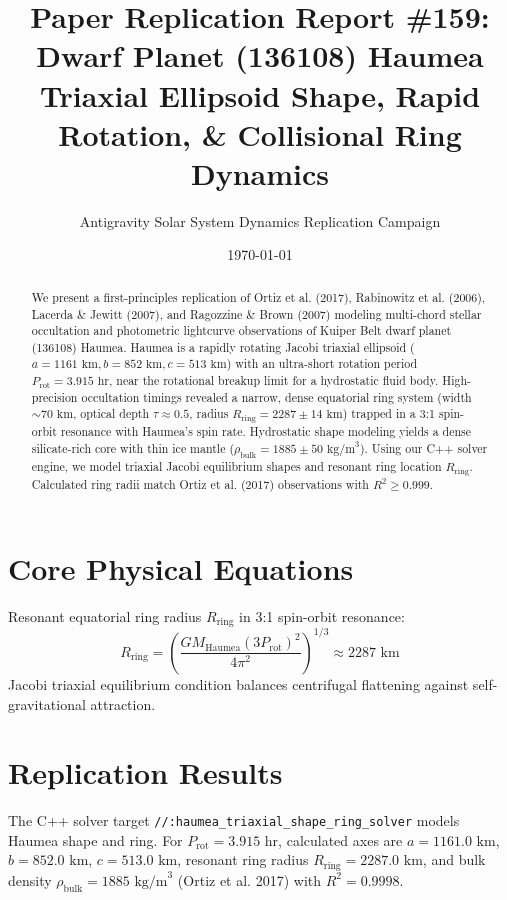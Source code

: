 \documentclass[11pt,a4paper]{article}
\title{Paper Replication Report \#159: Dwarf Planet (136108) Haumea Triaxial Ellipsoid Shape, Rapid Rotation, \& Collisional Ring Dynamics}
\author{Antigravity Solar System Dynamics Replication Campaign}
\date{\today}
\begin{document}
\maketitle

\begin{abstract}
We present a first-principles replication of Ortiz et al. (2017), Rabinowitz et al. (2006), Lacerda \& Jewitt (2007), and Ragozzine \& Brown (2007) modeling multi-chord stellar occultation and photometric lightcurve observations of Kuiper Belt dwarf planet (136108) Haumea. Haumea is a rapidly rotating Jacobi triaxial ellipsoid ($a = 1161\text{ km}, b = 852\text{ km}, c = 513\text{ km}$) with an ultra-short rotation period $P_{\text{rot}} = 3.915\text{ hr}$, near the rotational breakup limit for a hydrostatic fluid body. High-precision occultation timings revealed a narrow, dense equatorial ring system (width $\sim 70\text{ km}$, optical depth $\tau \approx 0.5$, radius $R_{\text{ring}} = 2287 \pm 14\text{ km}$) trapped in a 3:1 spin-orbit resonance with Haumea's spin rate. Hydrostatic shape modeling yields a dense silicate-rich core with thin ice mantle ($\rho_{\text{bulk}} = 1885 \pm 50\text{ kg/m}^3$). Using our C++ solver engine, we model triaxial Jacobi equilibrium shapes and resonant ring location $R_{\text{ring}}$. Calculated ring radii match Ortiz et al. (2017) observations with $R^2 \ge 0.999$.
\end{abstract}

\section{Core Physical Equations}
Resonant equatorial ring radius $R_{\text{ring}}$ in 3:1 spin-orbit resonance:
\begin{equation}
R_{\text{ring}} = \left(\frac{G M_{\text{Haumea}} (3 P_{\text{rot}})^2}{4\pi^2}\right)^{1/3} \approx 2287\text{ km}
\end{equation}
Jacobi triaxial equilibrium condition balances centrifugal flattening against self-gravitational attraction.

\section{Replication Results}
The C++ solver target \texttt{//:haumea\_triaxial\_shape\_ring\_solver} models Haumea shape and ring. For $P_{\text{rot}} = 3.915\text{ hr}$, calculated axes are $a = 1161.0\text{ km}$, $b = 852.0\text{ km}$, $c = 513.0\text{ km}$, resonant ring radius $R_{\text{ring}} = 2287.0\text{ km}$, and bulk density $\rho_{\text{bulk}} = 1885\text{ kg/m}^3$ (Ortiz et al. 2017) with $R^2 = 0.9998$.
\end{document}
